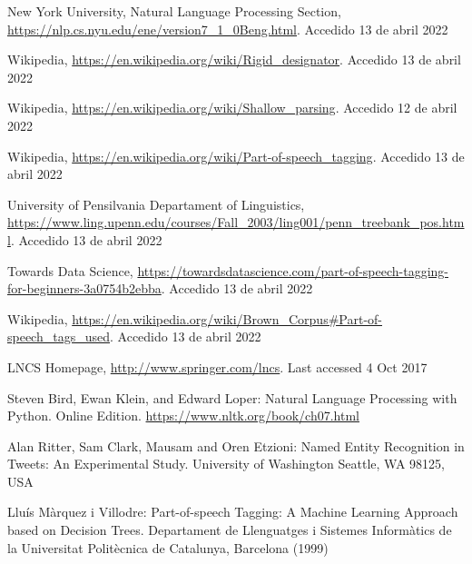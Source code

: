 \documentclass[runningheads]{llncs}
\begin{document}
\begin{thebibliography}{8}
%
%
%

New York University, Natural Language Processing Section, \url{https://nlp.cs.nyu.edu/ene/version7\_1\_0Beng.html}. Accedido 13
de abril 2022

Wikipedia, \url{https://en.wikipedia.org/wiki/Rigid\_designator}. Accedido 13
de abril 2022

Wikipedia, \url{https://en.wikipedia.org/wiki/Shallow\_parsing}. Accedido 12 de abril
2022

Wikipedia, \url{https://en.wikipedia.org/wiki/Part-of-speech\_tagging}. Accedido 13 de abril
2022

University of Pensilvania Departament of Linguistics, \url{https://www.ling.upenn.edu/courses/Fall\_2003/ling001/penn\_treebank\_pos.html}. Accedido 13 de abril 2022

Towards Data Science, \url{https://towardsdatascience.com/part-of-speech-tagging-for-beginners-3a0754b2ebba}. Accedido 13 de abril
2022

Wikipedia, \url{https://en.wikipedia.org/wiki/Brown\_Corpus\#Part-of-speech\_tags\_used}. Accedido 13 de abril 2022

LNCS Homepage, \url{http://www.springer.com/lncs}. Last accessed 4
Oct 2017

Steven Bird, Ewan Klein, and Edward Loper: Natural Language Processing with Python. Online Edition. \url{https://www.nltk.org/book/ch07.html}

Alan Ritter, Sam Clark, Mausam and Oren Etzioni: Named Entity Recognition in Tweets:
An Experimental Study. University of Washington Seattle, WA 98125, USA

Lluís Màrquez i Villodre: Part-of-speech Tagging: A Machine Learning Approach based on Decision Trees. Departament de Llenguatges i Sistemes Informàtics de la Universitat Politècnica de Catalunya, Barcelona (1999)


\end{thebibliography}
\end{document}
